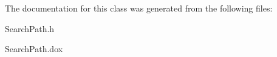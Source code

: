 The documentation for this class was generated from the following files\-:\begin{DoxyCompactItemize}
\item 
Search\-Path.\-h\item 
Search\-Path.\-dox\end{DoxyCompactItemize}
